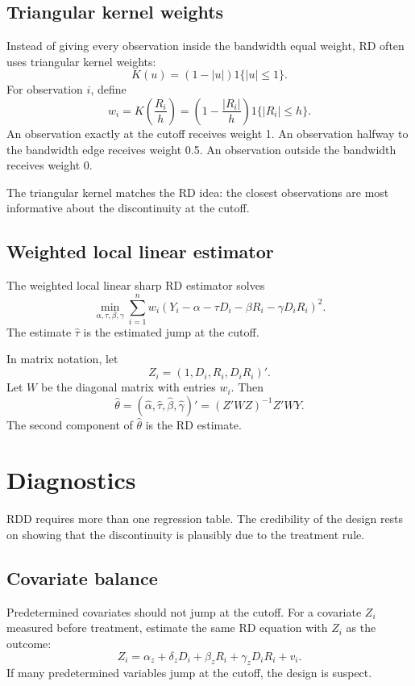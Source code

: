 \subsection{Triangular kernel weights}

Instead of giving every observation inside the bandwidth equal weight, RD often uses triangular kernel weights:
\[
    K(u)= (1-|u|)1\{|u|\leq 1\}.
\]
For observation $i$, define
\[
    w_i = K\left(\frac{R_i}{h}\right)
        =
        \left(1-\frac{|R_i|}{h}\right)1\{|R_i|\leq h\}.
\]
An observation exactly at the cutoff receives weight 1. An observation halfway to the bandwidth edge receives weight 0.5. An observation outside the bandwidth receives weight 0.

The triangular kernel matches the RD idea: the closest observations are most informative about the discontinuity at the cutoff.

\subsection{Weighted local linear estimator}

The weighted local linear sharp RD estimator solves
\[
    \min_{\alpha,\tau,\beta,\gamma}
    \sum_{i=1}^n
    w_i
    \left(
        Y_i-\alpha-\tau D_i-\beta R_i-\gamma D_iR_i
    \right)^2.
\]
The estimate $\hat{\tau}$ is the estimated jump at the cutoff.

In matrix notation, let
\[
    Z_i = (1, D_i, R_i, D_iR_i)'.
\]
Let $W$ be the diagonal matrix with entries $w_i$. Then
\[
    \hat{\theta}
    =
    (\hat{\alpha},\hat{\tau},\hat{\beta},\hat{\gamma})'
    =
    (Z'WZ)^{-1}Z'WY.
\]
The second component of $\hat{\theta}$ is the RD estimate.

\section{Diagnostics}

RDD requires more than one regression table. The credibility of the design rests on showing that the discontinuity is plausibly due to the treatment rule.

\subsection{Covariate balance}

Predetermined covariates should not jump at the cutoff. For a covariate $Z_i$ measured before treatment, estimate the same RD equation with $Z_i$ as the outcome:
\[
    Z_i = \alpha_z + \delta_z D_i + \beta_z R_i + \gamma_zD_iR_i + v_i.
\]
If many predetermined variables jump at the cutoff, the design is suspect.

